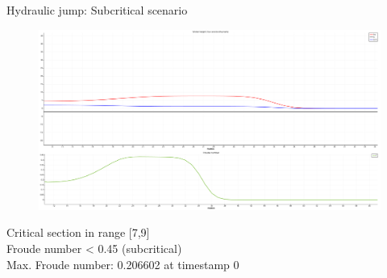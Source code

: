 \documentclass[shortpres]{beamer}
\newcommand{\imgfullscale}{0.75}
\begin{document}
\begin{frame}{Hydraulic jump: Subcritical scenario}
	\begin{figure}
		\includegraphics[clip, width=\imgfullscale\linewidth]{img/Subcritical.png}
	\end{figure}
		Critical section in range [7,9]\\
		Froude number < 0.45 (subcritical)\\
		Max. Froude number: 0.206602 at timestamp 0	
\end{frame}
\end{document}
